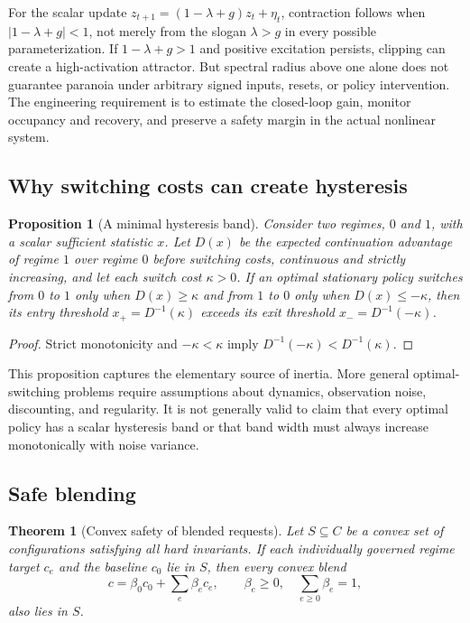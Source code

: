 \documentclass[11pt]{article}
\newtheorem{theorem}{Theorem}
\newtheorem{proposition}{Proposition}
\begin{document}
For the scalar update $z_{t+1}=(1-\lambda+g)z_t+\eta_t$, contraction follows
when $|1-\lambda+g|<1$, not merely from the slogan $\lambda>g$ in every possible
parameterization.  If $1-\lambda+g>1$ and positive excitation persists, clipping
can create a high-activation attractor.  But spectral radius above one alone does
not guarantee paranoia under arbitrary signed inputs, resets, or policy
intervention.  The engineering requirement is to estimate the closed-loop gain,
monitor occupancy and recovery, and preserve a safety margin in the actual
nonlinear system.

\subsection{Why switching costs can create hysteresis}

\begin{proposition}[A minimal hysteresis band]
\label{prop:hysteresis}
Consider two regimes, $0$ and $1$, with a scalar sufficient statistic $x$.  Let
$D(x)$ be the expected continuation advantage of regime $1$ over regime $0$
before switching costs, continuous and strictly increasing, and let each switch
cost $\kappa>0$.  If an optimal stationary policy switches from $0$ to $1$ only
when $D(x)\ge\kappa$ and from $1$ to $0$ only when $D(x)\le-\kappa$, then its
entry threshold $x_+=D^{-1}(\kappa)$ exceeds its exit threshold
$x_-=D^{-1}(-\kappa)$.
\end{proposition}

\begin{proof}
Strict monotonicity and $-\kappa<\kappa$ imply
$D^{-1}(-\kappa)<D^{-1}(\kappa)$.
\end{proof}

This proposition captures the elementary source of inertia.  More general
optimal-switching problems require assumptions about dynamics, observation
noise, discounting, and regularity.  It is not generally valid to claim that
every optimal policy has a scalar hysteresis band or that band width must always
increase monotonically with noise variance.

\subsection{Safe blending}

\begin{theorem}[Convex safety of blended requests]
\label{thm:blend}
Let $S\subseteq C$ be a convex set of configurations satisfying all hard
invariants.  If each individually governed regime target $c_e$ and the baseline
$c_0$ lie in $S$, then every convex blend
\begin{equation}
c=\beta_0c_0+\sum_e\beta_ec_e,
\qquad \beta_e\ge0,\quad \sum_{e\ge0}\beta_e=1,
\end{equation}
also lies in $S$.
\end{theorem}
\end{document}
